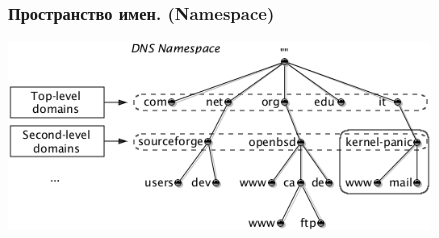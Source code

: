\begin{frame}
    \frametitle{Пространство имен. (Namespace)}
    \includegraphics[height=5cm]{../../slides/dns/images/namespace.png}
\end{frame}